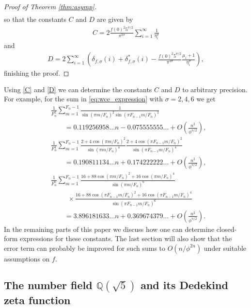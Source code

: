 \documentclass[]{interact}
\newcommand{\bbQ}{\mathbb{Q}}
\theoremstyle{definition}
\numberwithin{table}{section} %
\numberwithin{figure}{section}
\begin{document}
\begin{proof}[Proof of Theorem \ref{thm:asymp}]
\begin{align*}
    \end{align*}
    so that the constants $C$ and $D$ are given by
    \begin{align} \label{C}
        C = 2\frac{f(0)^2 5^{\sigma/2}}{\pi^{2\sigma}} \sum_{i=1}^\infty \frac1{\eta_i^\sigma}
    \end{align}
    and
    \begin{align} \label{D}
        D = 2\sum_{i=1}^\infty \left(\delta_{f, \sigma}(i) + \delta_{f, \sigma}^*(i) - \frac{f(0)^2 5^{\sigma/2}}{\pi^{2\sigma}} \frac{\mu_i+1}{\eta_i^\sigma}\right),
    \end{align}
    finishing the proof.
\end{proof}

Using \eqref{C} and \eqref{D} we can determine the constants $C$ and $D$ to arbitrary precision. For example, for the sum in \eqref{eq:wce_expression} with $\sigma = 2, 4, 6$ we get
\begin{align*}
    & \frac1{F_n^2} \sum_{m=1}^{F_n-1} \frac1{\sin(\pi m / F_n)^2 \sin(\pi F_{n-1} m/F_n)^2} \\
    & \quad\quad = 0.119256958\dots n - 0.075555555\ldots + O\left(\frac{n^2}{\phi^{n/2}}\right), \\
    & \frac1{F_n^4} \sum_{m=1}^{F_n-1} \frac{2+4\cos(\pi m/F_n)^2}{\sin(\pi m/F_n)^4} \frac{2+4\cos(\pi F_{n-1}m/F_n)^2}{\sin(\pi F_{n-1}m/F_n)^4} \\
    & \quad\quad = 0.190811134\dots n + 0.174222222\ldots+O\left(\frac{n^2}{\phi^{n/2}}\right), \\
    & \frac1{F_n^6} \sum_{m=1}^{F_n-1} \frac{16+88\cos(\pi m/F_n)^2+16\cos(\pi m/F_n)^4}{\sin(\pi m/F_n)^6} \\
    & \phantom{\frac1{F_n^6}} ~~~~~~~ \times \frac{16+88\cos(\pi F_{n-1}m/F_n)^2+16\cos(\pi F_{n-1}m/F_n)^4}{\sin(\pi F_{n-1}m/F_n)^6} \\
    & \quad\quad = 3.896181633\dots n+0.369674379\ldots+O\left(\frac{n^2}{\phi^{n/2}}\right).
\end{align*}
In the remaining parts of this paper we discuss how one can determine closed-form expressions for these constants. The last section will also show that the error term can probably be improved for such sums to $O(n/\phi^{2n})$ under suitable assumptions on $f$.

\subsection{The number field $\bbQ(\sqrt5)$ and its Dedekind zeta function}
\end{document}
